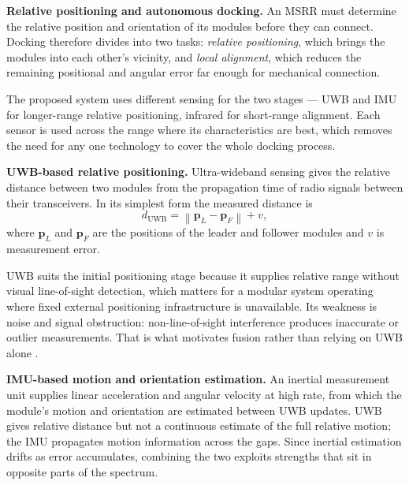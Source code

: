 \documentclass[11pt,a4paper]{article}
\newif\ifreview
\newcommand{\pending}[1]{\ifreview{\color{blue}#1}\else#1\fi}
\newcounter{gsec}
\newcounter{gsub}
\newcommand{\curgsec}{}
\newcommand{\gsep}{\texorpdfstring{\quad}{ }}
\newcommand{\gtocsub}[2]{%
  \phantomsection
  \addcontentsline{toc}{subsection}{#1\gsep #2}%
}
\newcommand{\gsubsection}[1]{%
  \refstepcounter{gsub}%
  \edef\gsublbl{\curgsec.\thegsub}%
  \expandafter\gtocsub\expandafter{\gsublbl}{#1}%
  \subsection*{\gsublbl\quad #1}%
}
\begin{document}
\pending{}

\pending{%
\noindent\textbf{Relative positioning and autonomous docking.} An MSRR must
determine the relative position and orientation of its modules before they can
connect. Docking therefore divides into two tasks: \emph{relative positioning},
which brings the modules into each other's vicinity, and \emph{local
alignment}, which reduces the remaining positional and angular error far enough
for mechanical connection.

The proposed system uses different sensing for the two stages --- UWB and IMU
for longer-range relative positioning, infrared for short-range alignment. Each
sensor is used across the range where its characteristics are best, which
removes the need for any one technology to cover the whole docking process.

\noindent\textbf{UWB-based relative positioning.} Ultra-wideband sensing gives
the relative distance between two modules from the propagation time of radio
signals between their transceivers. In its simplest form the measured distance
is
\begin{equation}
  d_{\text{UWB}} = \left\lVert \mathbf{p}_L - \mathbf{p}_F \right\rVert + v,
  \label{eq:uwb}
\end{equation}
where $\mathbf{p}_L$ and $\mathbf{p}_F$ are the positions of the leader and
follower modules and $v$ is measurement error.

UWB suits the initial positioning stage because it supplies relative range
without visual line-of-sight detection, which matters for a modular system
operating where fixed external positioning infrastructure is unavailable.
Its weakness is noise and signal obstruction: non-line-of-sight interference
produces inaccurate or outlier measurements. That is what motivates fusion
rather than relying on UWB alone \cite{zhang2022}.

\noindent\textbf{IMU-based motion and orientation estimation.} An inertial
measurement unit supplies linear acceleration and angular velocity at high
rate, from which the module's motion and orientation are estimated between UWB
updates. UWB gives relative distance but not a continuous estimate of the full
relative motion; the IMU propagates motion information across the gaps. Since
inertial estimation drifts as error accumulates, combining the two exploits
strengths that sit in opposite parts of the spectrum.

}
\end{document}
